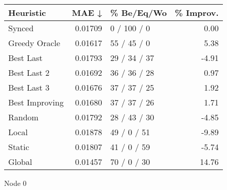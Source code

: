 \begin{tabular}{lrlr}
\toprule
\textbf{Heuristic} & \textbf{MAE ↓} & \textbf{\% Be/Eq/Wo} & \textbf{\% Improv.} \\
\midrule
            Synced &        0.01709 &          0 / 100 / 0 &                0.00 \\
     Greedy Oracle &        0.01617 &          55 / 45 / 0 &                5.38 \\
         Best Last &        0.01793 &         29 / 34 / 37 &               -4.91 \\
       Best Last 2 &        0.01692 &         36 / 36 / 28 &                0.97 \\
       Best Last 3 &        0.01676 &         37 / 37 / 25 &                1.92 \\
    Best Improving &        0.01680 &         37 / 37 / 26 &                1.71 \\
            Random &        0.01792 &         28 / 43 / 30 &               -4.85 \\
             Local &        0.01878 &          49 / 0 / 51 &               -9.89 \\
            Static &        0.01807 &          41 / 0 / 59 &               -5.74 \\
            Global &        0.01457 &          70 / 0 / 30 &               14.76 \\
\bottomrule
\end{tabular}
\caption{Node 0}
\label{tab:non_lr05_le2_bs2_0}
